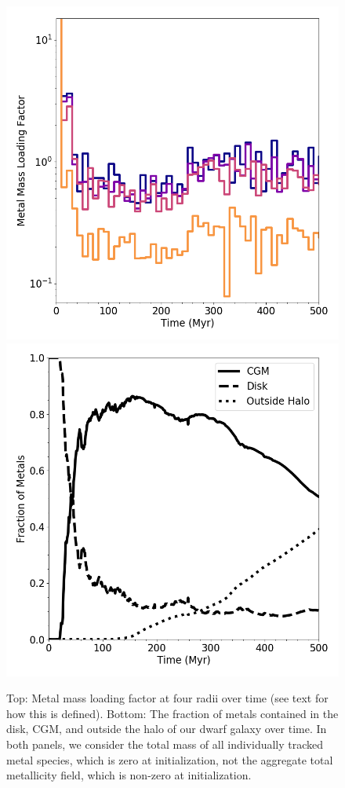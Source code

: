 \documentclass[twocolumn]{aastex61}
\begin{document}
\begin{figure}
\centering
\includegraphics[width=0.9\linewidth]{metal_mass_loading} \\
\includegraphics[width=0.9\linewidth]{metal_fraction_evolution}
\caption{Top: Metal mass loading factor at four radii over time (see text for how this is defined). Bottom: The fraction of metals contained in the disk, CGM, and outside the halo of our dwarf galaxy over time. In both panels, we consider the total mass of all individually tracked metal species, which is zero at initialization, not the aggregate total metallicity field, which is non-zero at initialization.}
\label{fig:metal_evolution}
\end{figure}
\end{document}
